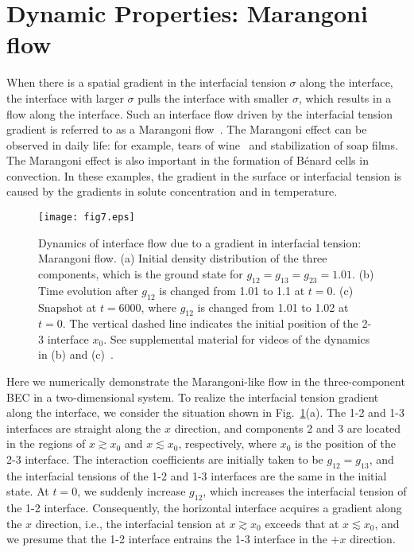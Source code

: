 \documentclass[pra,aps,superscriptaddress,twocolumn,color]{revtex4-1}
\begin{document}
\section{Dynamic Properties: Marangoni flow}
\label{s:dynamic}

When there is a spatial gradient in the interfacial tension $\sigma$ along
the interface, the interface with larger $\sigma$ pulls the interface with
smaller $\sigma$, which results in a flow along the interface.
Such an interface flow driven by the interfacial tension gradient is
referred to as a Marangoni flow~\cite{Marangoni}.
The Marangoni effect can be observed in daily life: for example, tears of
wine~\cite{Thomson} and stabilization of soap films.
The Marangoni effect is also important in the formation of B\'enard cells in
convection.
In these examples, the gradient in the surface or interfacial tension is
caused by the gradients in solute concentration and in temperature.

\begin{figure}[tb]
\texttt{[image: fig7.eps]}
\caption{
  Dynamics of interface flow due to a gradient in interfacial tension:
  Marangoni flow. 
  (a) Initial density distribution of the three components, which is the
  ground state for $g_{12} = g_{13} = g_{23} = 1.01$.
  (b) Time evolution after $g_{12}$ is changed from 1.01 to 1.1 at $t = 0$.
  (c) Snapshot at $t = 6000$, where $g_{12}$ is changed from 1.01 to 1.02 at
  $t = 0$.
  The vertical dashed line indicates the initial position of the 2-3
  interface $x_0$.
  See supplemental material for videos of the dynamics in (b) and
  (c)~\cite{movies}.
}
\label{f:marangoni}
\end{figure}
Here we numerically demonstrate the Marangoni-like flow in the
three-component BEC in a two-dimensional system.
To realize the interfacial tension gradient along the interface, we consider
the situation shown in Fig.~\ref{f:marangoni}(a).
The 1-2 and 1-3 interfaces are straight along the $x$ direction, and
components 2 and 3 are located in the regions of $x \gtrsim x_0$ and $x
\lesssim x_0$, respectively, where $x_0$ is the position of the 2-3
interface.
The interaction coefficients are initially taken to be $g_{12} = g_{13}$,
and the interfacial tensions of the 1-2 and 1-3 interfaces are the same in
the initial state.
At $t = 0$, we suddenly increase $g_{12}$, which increases the interfacial
tension of the 1-2 interface.
Consequently, the horizontal interface acquires a gradient along the $x$
direction, i.e., the interfacial tension at $x \gtrsim x_0$ exceeds that at
$x \lesssim x_0$, and we presume that the 1-2 interface entrains the 1-3
interface in the $+x$ direction.
\end{document}
